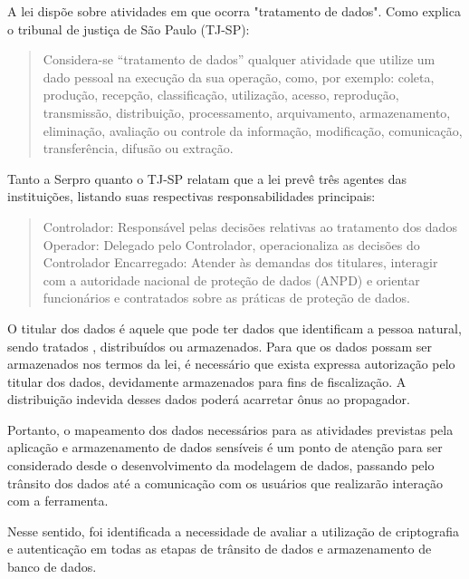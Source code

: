 \documentclass[
    12pt,               %
    openright,          %
    oneside,
    a4paper,            %
    BIBLATEX,           %
    TODO,               %
    english,            %
    brazil              %
    ]{ifsp-spo-inf-ctds}
\begin{document}
            A lei dispõe sobre atividades em que ocorra "tratamento de dados". Como explica o tribunal de justiça de São Paulo (TJ-SP):
            
            \begin{quote}
                Considera-se “tratamento de dados” qualquer atividade que utilize um dado pessoal na execução da sua operação, como, por exemplo: coleta, produção, recepção, classificação, utilização, acesso, reprodução, transmissão, distribuição, processamento, arquivamento, armazenamento, eliminação, avaliação ou controle da informação, modificação, comunicação, transferência, difusão ou extração.
            \end{quote}
            
            Tanto a Serpro quanto o TJ-SP relatam que a lei prevê três agentes das instituições, listando suas respectivas responsabilidades principais:
            
            \begin{quote}
                Controlador: Responsável pelas decisões relativas ao tratamento dos dados
                Operador: Delegado pelo Controlador, operacionaliza as decisões do Controlador
                Encarregado: Atender às demandas dos titulares, interagir com a autoridade nacional de proteção de dados (ANPD) e orientar funcionários e contratados sobre as práticas de proteção de dados.
            \end{quote}
            
            O titular dos dados é aquele que pode ter dados que identificam a pessoa natural, sendo tratados , distribuídos ou armazenados. Para que os dados possam ser armazenados nos termos da lei, é necessário que exista expressa autorização pelo titular dos dados, devidamente armazenados para fins de fiscalização. A distribuição indevida desses dados poderá acarretar ônus ao propagador. \cite{lgpdComoCumprir}
            
            Portanto, o mapeamento dos dados necessários para as atividades previstas pela aplicação e armazenamento de dados sensíveis é um ponto de atenção para ser considerado desde o desenvolvimento da modelagem de dados, passando pelo trânsito dos dados até a comunicação com os usuários que realizarão interação com a ferramenta.
            
            Nesse sentido, foi identificada a necessidade de avaliar a utilização de criptografia e autenticação em todas as etapas de trânsito de dados e armazenamento de banco de dados.
    
\end{document}
